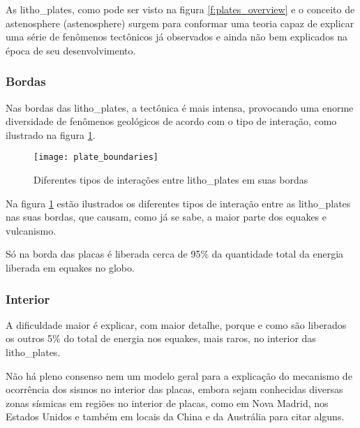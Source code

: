 As \glspl{litho_plate}, como pode ser visto na figura \ref{f:plates_overview} 
e o conceito de \gls{astenosphere} (\glsdesc{astenosphere}) 
surgem para conformar uma teoria capaz de explicar
uma série de fenômenos tectônicos já observados e ainda não bem explicados na época
de seu desenvolvimento. 


\subsubsection{Bordas}
\label{sec:02_bordas}

Nas bordas das \glspl{litho_plate}, a tectônica é mais intensa, 
provocando uma enorme diversidade de fenômenos geológicos de acordo
com o tipo de interação, como ilustrado na figura \ref{f:plate_boundaries}.

\begin{figure}[H]
   \centering
   \texttt{[image: plate\_boundaries]}
   \caption[Diferentes tipos de interações entre \glspl{litho_plate} em suas bordas]
   		   {Diferentes tipos de interações entre \glspl{litho_plate} em suas bordas\footnotemark} 
   \label{f:plate_boundaries}
\end{figure} 
 
Na figura \ref{f:plate_boundaries} estão ilustrados os diferentes tipos de interação 
entre as \glspl{litho_plate} nas suas bordas, que causam, como já se sabe, a maior
parte dos \glspl{equake} e vulcanismo.

Só na borda das placas é liberada cerca de 95\% da quantidade total da energia 
liberada em \glspl{equake} no globo.

\subsubsection{Interior}
\label{sec:02_interior}

A dificuldade maior é explicar, com maior detalhe, porque e como são liberados os outros 
5\% do total de energia nos \glspl{equake}, mais raros, no interior das \glspl{litho_plate}.

Não há pleno consenso nem um modelo geral para a explicação do mecanismo de ocorrência dos
sismos no interior das placas, embora sejam conhecidas diversas zonas sísmicas em regiões no interior
de placas, como em Nova Madrid, nos Estados Unidos e também em locais da China e da Austrália para citar alguns.



